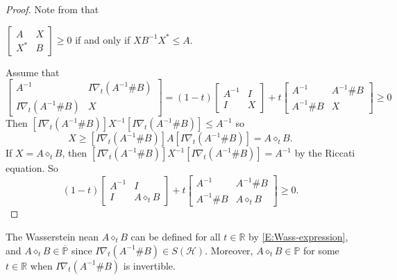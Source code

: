 \documentclass[12pt,reqno]{amsart}
\begin{document}
\begin{proof}
Note from \cite[Theorem 1.3.3]{Bh} that
\begin{center}
$\displaystyle \begin{bmatrix} A & X \\ X^{*} & B \end{bmatrix} \geq 0$ \quad if and only if \quad $X B^{-1} X^{*} \leq A$.
\end{center}
Assume that
\begin{displaymath}
\begin{bmatrix}
  A^{-1} & I \nabla_{t} (A^{-1} \# B) \\
  I \nabla_{t} (A^{-1} \# B) & X
\end{bmatrix}
= (1-t)
\begin{bmatrix}
  A^{-1} & I \\
  I & X
\end{bmatrix} + t
\begin{bmatrix}
  A^{-1} & A^{-1} \# B \\
  A^{-1} \# B & X
\end{bmatrix} \geq 0
\end{displaymath}
Then $[ I \nabla_{t} (A^{-1} \# B) ] X^{-1} [ I \nabla_{t} (A^{-1} \# B) ] \leq A^{-1}$ so
\begin{displaymath}
X \geq [ I \nabla_{t} (A^{-1} \# B) ] A [ I \nabla_{t} (A^{-1} \# B) ] = A \diamond_{t} B.
\end{displaymath}
If $X = A \diamond_{t} B$, then $[ I \nabla_{t} (A^{-1} \# B) ] X^{-1} [ I \nabla_{t} (A^{-1} \# B) ] = A^{-1}$ by the Riccati equation. So
\begin{displaymath}
(1-t)
\begin{bmatrix}
  A^{-1} & I \\
  I & A \diamond_{t} B
\end{bmatrix} + t
\begin{bmatrix}
  A^{-1} & A^{-1} \# B \\
  A^{-1} \# B & A \diamond_{t} B
\end{bmatrix} \geq 0.
\end{displaymath}
\end{proof}

The Wasserstein nean $A \diamond_{t} B$ can be defined for all $t \in \mathbb{R}$ by \eqref{E:Wass-expression}, and $A \diamond_{t} B \in \overline{\mathbb{P}}$ since $I \nabla_{t} (A^{-1} \# B) \in S(\mathcal{H})$. Moreover, $A \diamond_{t} B \in \mathbb{P}$ for some $t \in \mathbb{R}$ when $I \nabla_{t} (A^{-1} \# B)$ is invertible.
\end{document}
